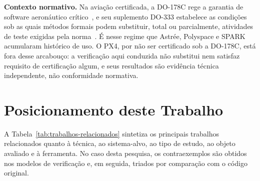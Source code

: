 \textbf{Contexto normativo.} Na aviação certificada, a DO-178C rege a garantia de
software aeronáutico crítico~\cite{RTCA_DO178C}, e seu suplemento DO-333
estabelece as condições sob as quais métodos formais podem substituir, total ou
parcialmente, atividades de teste exigidas pela norma~\cite{RTCA_DO333}. É nesse
regime que Astrée, Polyspace e SPARK acumularam histórico de uso. O PX4, por não
ser certificado sob a DO-178C, está fora desse arcabouço: a verificação aqui
conduzida não substitui nem satisfaz requisito de certificação algum, e seus
resultados são evidência técnica independente, não conformidade normativa.

\section{Posicionamento deste Trabalho}
\label{sec:rel-posicionamento}

A Tabela~\ref{tab:trabalhos-relacionados} sintetiza os principais trabalhos
relacionados quanto à técnica, ao sistema-alvo, ao tipo de estudo, ao objeto
avaliado e à ferramenta. No caso desta pesquisa, os contraexemplos são obtidos
nos modelos de verificação e, em seguida, triados por comparação com o código
original.

